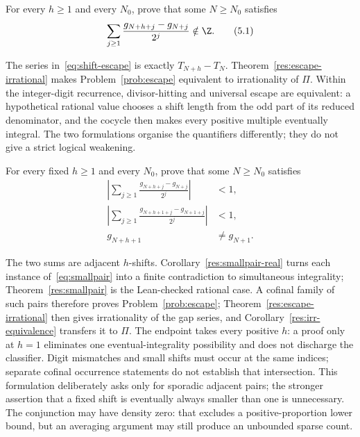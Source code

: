 \documentclass[11pt]{article}
\begin{document}
\begin{problem}\label{prob:escape}
For every $h\ge1$ and every $N_0$, prove that some $N\ge N_0$ satisfies
\[
 \sum_{j\ge1}
 \frac{g_{N+h+j}-g_{N+j}}{2^j}\notin\Z .
\tag{5.1}\label{eq:shift-escape}
\]
\end{problem}

The series in~\eqref{eq:shift-escape} is exactly $T_{N+h}-T_N$.  Theorem~\ref{res:escape-irrational} makes
Problem~\ref{prob:escape} equivalent to irrationality of $\Pi$.  Within the
integer-digit recurrence, divisor-hitting and universal escape are equivalent:
a hypothetical rational value chooses a shift length from the odd part of its
reduced denominator, and the cocycle then makes every positive multiple
eventually integral.  The two formulations organise the quantifiers
differently; they do not give a strict logical weakening.

\begin{problem}\label{prob:smallpair}
For every fixed $h\ge1$ and every $N_0$, prove that some $N\ge N_0$ satisfies
\[
\begin{split}
\left|\sum_{j\ge1}
 \frac{g_{N+h+j}-g_{N+j}}{2^j}\right|&<1,\\
\left|\sum_{j\ge1}
 \frac{g_{N+h+1+j}-g_{N+1+j}}{2^j}\right|&<1,\\
g_{N+h+1}&\ne g_{N+1}.
\end{split}
\tag{5.2}\label{eq:smallpair}
\]
\end{problem}

The two sums are adjacent $h$-shifts.  Corollary~\ref{res:smallpair-real} turns
each instance of~\eqref{eq:smallpair} into a finite contradiction to
simultaneous integrality; Theorem~\ref{res:smallpair} is the Lean-checked
rational case.  A cofinal family of such pairs therefore proves
Problem~\ref{prob:escape}; Theorem~\ref{res:escape-irrational} then gives irrationality
of the gap series, and Corollary~\ref{res:irr-equivalence} transfers it to
$\Pi$.  The endpoint takes every positive $h$: a proof only at $h=1$
eliminates one eventual-integrality possibility and does not discharge the
classifier.  Digit mismatches and small shifts must occur at the same indices;
separate cofinal occurrence statements do not establish that intersection.
This formulation deliberately asks only for sporadic adjacent pairs;
the stronger assertion that a fixed shift is eventually always smaller than
one is unnecessary.  The conjunction may have density zero: that excludes a
positive-proportion lower bound, but an averaging argument may still produce
an unbounded sparse count.
\end{document}
